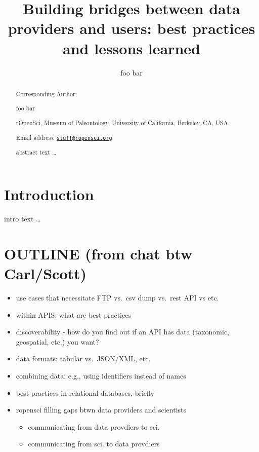 \documentclass[author-year, review, 11pt]{components/elsarticle} %
\def\tightlist{}
\begin{document}
\begin{frontmatter}

  \title{Building bridges between data providers and users: best practices and
lessons learned}
    \author[cstar]{foo bar}
      \address[cstar]{rOpenSci, Museum of Paleontology, University of California, Berkeley,
CA, USA}
  
  \begin{abstract}
  Corresponding Author:
  
  foo bar
  
  rOpenSci, Museum of Paleontology, University of California, Berkeley,
  CA, USA
  
  Email address:
  \href{mailto:stuff@ropensci.org}{\nolinkurl{stuff@ropensci.org}}
  
  \newpage
  
  abstract text \ldots{}
  \end{abstract}
  
 \end{frontmatter}


\newpage

\hypertarget{introduction}{%
\section{Introduction}\label{introduction}}

intro text \ldots{}

\hypertarget{outline-from-chat-btw-carlscott}{%
\section{OUTLINE (from chat btw
Carl/Scott)}\label{outline-from-chat-btw-carlscott}}

\begin{itemize}
\tightlist
\item
  use cases that necessitate FTP vs.~csv dump vs.~rest API vs etc.
\item
  within APIS: what are best practices
\item
  discoverability - how do you find out if an API has data (taxonomic,
  geospatial, etc.) you want?
\item
  data formats: tabular vs.~JSON/XML, etc.
\item
  combining data: e.g., using identifiers instead of names
\item
  best practices in relational databases, briefly
\item
  ropensci filling gaps btwn data providers and scientists

  \begin{itemize}
  \tightlist
  \item
    communicating from data provdiers to sci.
  \item
    communicating from sci. to data provdiers
  \end{itemize}
\end{itemize}
\end{document}
